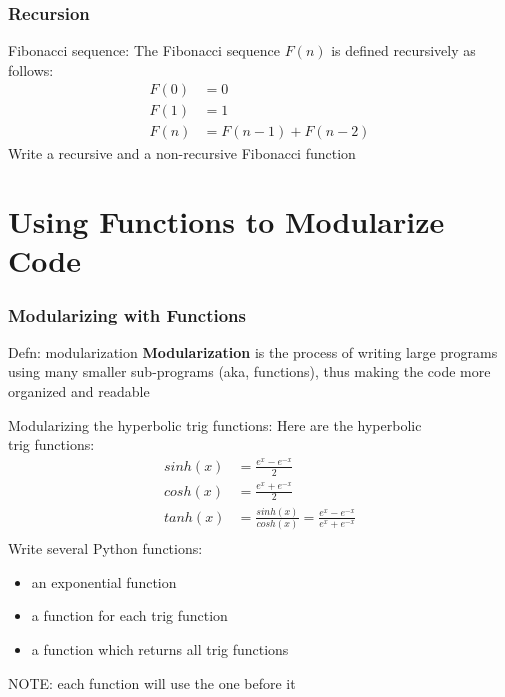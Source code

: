 \documentclass{beamer}
\begin{document}
\begin{frame}%
	\frametitle{Recursion}
	
	\begin{exampleblock}{Fibonacci sequence:}
		The Fibonacci sequence $F(n)$ is defined recursively as follows:
		\begin{equation*}
			\begin{split}
				F(0) & = 0 \\
				F(1) & = 1 \\
				F(n) & = F(n-1)+F(n-2)
			\end{split}
		\end{equation*}
		Write a recursive and a non-recursive Fibonacci function
	\end{exampleblock}
	
\end{frame}


\section{Using Functions to Modularize Code}

\begin{frame}	
\end{frame}

\begin{frame}%
	\frametitle{Modularizing with Functions}
	
	\begin{alertblock}{Defn: modularization}
		\textbf{Modularization} is the process of writing large programs using many smaller sub-programs (aka, functions), thus making the code more organized and readable
	\end{alertblock}
	
	\begin{exampleblock}{Modularizing the hyperbolic trig functions:}
			Here are the hyperbolic \\ trig functions:
			\begin{equation*}
				\begin{split}
					sinh(x) & = \frac{e^x-e^{-x}}{2} \\
					cosh(x) & = \frac{e^x+e^{-x}}{2} \\
					tanh(x) & = \frac{sinh(x)}{cosh(x)} = \frac{e^x-e^{-x}}{e^x+e^{-x}} \\
				\end{split}
			\end{equation*}
		\endminipage\hfill
			Write several Python functions:
			\begin{itemize}
				\item an exponential function
				\item a function for each trig function
				\item a function which returns all trig functions
			\end{itemize}
			NOTE: each function will use the one before it
		\endminipage\hfill
		
	\end{exampleblock}
	
\end{frame}
\end{document}
